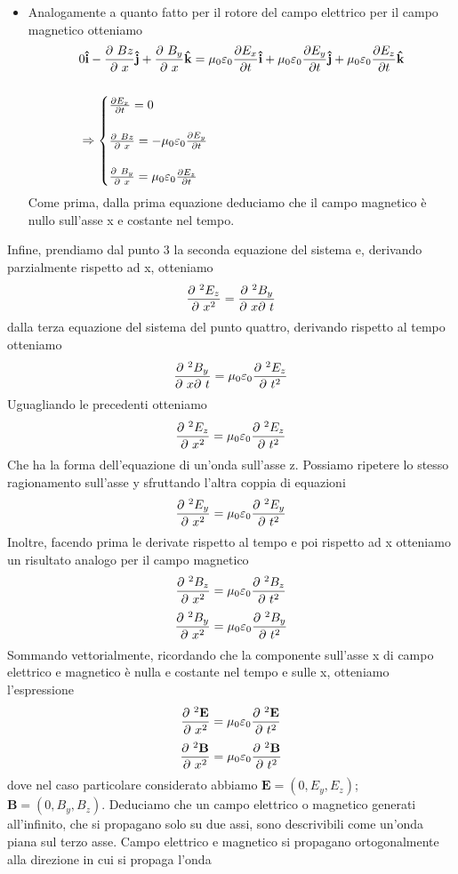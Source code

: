 \documentclass[10pt,a4paper]{article}
\def\d{\ensuremath\partial}
\def\d{\ensuremath\partial\ }
\begin{document}
\begin{itemize}
	\item Analogamente a quanto fatto per il rotore del campo elettrico per il campo magnetico otteniamo 
	\begin{align*}
		&0\mathbf{\hat{i}}-\frac{\d Bz}{\d x}\mathbf{\hat{j}}+ \frac{\d B_y}{\d x}\mathbf{\hat{k}}=\mu_0\varepsilon_0\frac{\partial E_x}{\partial t}\mathbf{\hat{i}} + \mu_0\varepsilon_0\frac{\partial E_y}{\partial t}\mathbf{\hat{j}} +\mu_0\varepsilon_0\frac{\partial E_z}{\partial t}\mathbf{\hat{k}}\\\\
		&\Rightarrow
		\begin{cases}
			\frac{\partial E_x}{\partial t} = 0\\\\
			\frac{\d Bz}{\d x} = -\mu_0\varepsilon_0\frac{\partial E_y}{\partial t}\\\\
			\frac{\d B_y}{\d x} = \mu_0\varepsilon_0\frac{\partial E_z}{\partial t}
		\end{cases}		
	\end{align*}
	Come prima, dalla prima equazione deduciamo che il campo magnetico è nullo sull'asse x e costante nel tempo.
\end{itemize}
Infine, prendiamo dal punto 3 la seconda equazione del sistema e, derivando parzialmente rispetto ad x, otteniamo
\[\frac{\d^2 E_z}{\d x^2} = \frac{\d^2 B_y}{\d x\d t} \]
dalla terza equazione del sistema del punto quattro, derivando rispetto al tempo otteniamo
\[\frac{\d^2 B_y}{\d x\d t} = \mu_0\varepsilon_0 \frac{\d^2 E_z}{\d t^2}\] 
Uguagliando le precedenti otteniamo
\[\frac{\d^2 E_z}{\d x^2}=\mu_0\varepsilon_0 \frac{\d^2 E_z}{\d t^2}\]
Che ha la forma dell'equazione di un'onda sull'asse z. Possiamo ripetere lo stesso ragionamento sull'asse y sfruttando l'altra coppia di equazioni 
\[\frac{\d^2 E_y}{\d x^2}=\mu_0\varepsilon_0 \frac{\d^2 E_y}{\d t^2}\]
Inoltre, facendo prima le derivate rispetto al tempo e poi rispetto ad x otteniamo un risultato analogo per il campo magnetico
\[\frac{\d^2 B_z}{\d x^2}=\mu_0\varepsilon_0 \frac{\d^2 B_z}{\d t^2}\]
\[\frac{\d^2 B_y}{\d x^2}=\mu_0\varepsilon_0 \frac{\d^2 B_y}{\d t^2}\]
Sommando vettorialmente, ricordando che la componente sull'asse x di campo elettrico e magnetico è nulla e costante nel tempo e sulle x, otteniamo l'espressione
\[\frac{\d^2 \mathbf{E}}{\d x^2}=\mu_0\varepsilon_0 \frac{\d^2 \mathbf{E}}{\d t^2}\]
\[\frac{\d^2 \mathbf{B}}{\d x^2}=\mu_0\varepsilon_0 \frac{\d^2 \mathbf{B}}{\d t^2}\]
dove nel caso particolare considerato abbiamo \(\mathbf{E}=(0, E_y,E_z)\); \(\mathbf{B}=(0, B_y, B_z)\). Deduciamo che un campo elettrico o magnetico generati all'infinito, che si propagano solo su due assi, sono descrivibili come un'onda piana sul terzo asse. Campo elettrico e magnetico si propagano ortogonalmente alla direzione in cui si propaga l'onda
\end{document}
